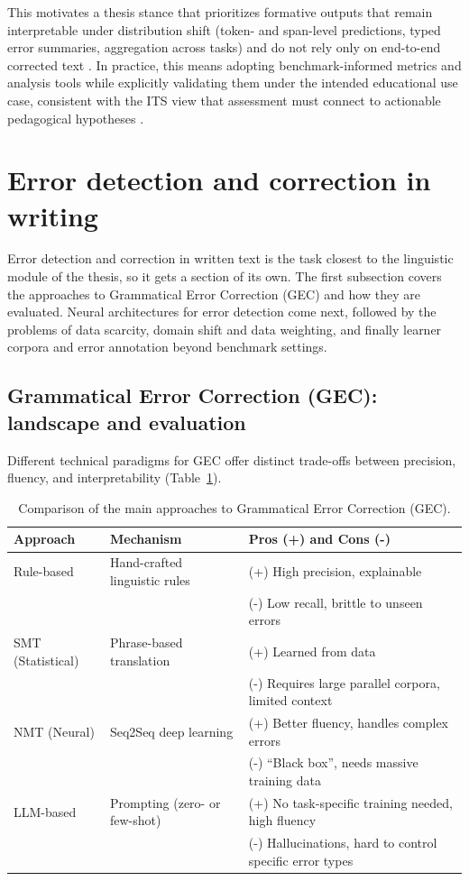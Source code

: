 This motivates a thesis stance that prioritizes formative outputs that remain interpretable under distribution shift (token- and span-level predictions, typed error summaries, aggregation across tasks) and do not rely only on end-to-end corrected text \parencite{BryantFeliceBriscoe2017,Ng2014}. In practice, this means adopting benchmark-informed metrics and analysis tools while explicitly validating them under the intended educational use case, consistent with the ITS view that assessment must connect to actionable pedagogical hypotheses \parencite{Woolf2010,VanLehn2006}.


\section{Error detection and correction in writing}
\label{sec:sota_gec}

Error detection and correction in written text is the task closest to the linguistic module of the thesis, so it gets a section of its own. The first subsection covers the approaches to Grammatical Error Correction (GEC) and how they are evaluated. Neural architectures for error detection come next, followed by the problems of data scarcity, domain shift and data weighting, and finally learner corpora and error annotation beyond benchmark settings.

\subsection{Grammatical Error Correction (GEC): landscape and evaluation}
\label{sec:sota_gec_landscape}

Different technical paradigms for GEC offer distinct trade-offs between precision, fluency, and interpretability (Table~\ref{tab:gec_approaches}).

\begin{table}[ht]
\centering
\caption{Comparison of the main approaches to Grammatical Error Correction (GEC).}
\label{tab:gec_approaches}
\begin{tabular}{p{}p{}p{}}
\toprule
\textbf{Approach} & \textbf{Mechanism} & \textbf{Pros (+) and Cons (-)} \\
\midrule
Rule-based & Hand-crafted linguistic rules & (+) High precision, explainable \\
& & (-) Low recall, brittle to unseen errors \\
\midrule
SMT (Statistical) & Phrase-based translation & (+) Learned from data \\
& & (-) Requires large parallel corpora, limited context \\
\midrule
NMT (Neural) & Seq2Seq deep learning & (+) Better fluency, handles complex errors \\
& & (-) ``Black box'', needs massive training data \\
\midrule
LLM-based & Prompting (zero- or few-shot) & (+) No task-specific training needed, high fluency \\
& & (-) Hallucinations, hard to control specific error types \\
\bottomrule
\end{tabular}
\end{table}

